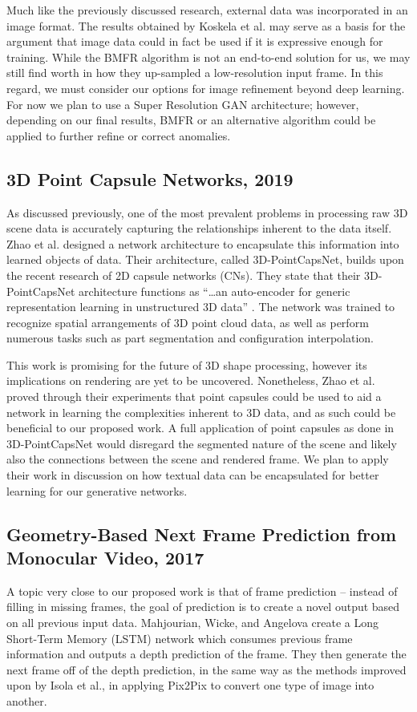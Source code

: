 \documentclass{article}
\begin{document}
Much like the previously discussed research, external data was incorporated
in an image format. The results obtained by Koskela et al. may serve as a basis
for the argument that image data could in fact be used if it is expressive enough
for training.
While the BMFR algorithm is not an end-to-end solution for us, we may still find
worth in how they up-sampled a low-resolution input frame. In this regard,
we must consider our options for image refinement beyond deep learning.
For now we plan to use a Super Resolution GAN architecture; however, depending on
our final results, BMFR or an alternative algorithm could be
applied to further refine or correct anomalies.

\subsection*{3D Point Capsule Networks, 2019}
\nocite{point_capsule}
As discussed previously, one of the most prevalent problems in processing raw 3D
scene data is accurately capturing the relationships inherent to the data itself.
Zhao et al. designed a network architecture to encapsulate this information into
learned objects of data. Their architecture, called 3D-PointCapsNet,
builds upon the recent research of 2D capsule networks (CNs).
They state that their 3D-PointCapsNet architecture functions as
``\dots an auto-encoder for generic representation
learning in unstructured 3D data'' \cite{point_capsule}. The network was trained
to recognize spatial arrangements of 3D point cloud data, as well as perform
numerous tasks such as part segmentation and configuration interpolation.

This work is promising for the future of 3D shape processing, however its
implications on rendering are yet to be uncovered. Nonetheless, Zhao et al.
proved through their experiments that point capsules could be used to
aid a network in learning the complexities inherent to 3D data, and as such
could be beneficial to our proposed work. A full application of point capsules
as done in 3D-PointCapsNet would disregard the segmented nature of the scene and
likely also the connections between the scene and rendered frame.
We plan to apply their work in discussion on how textual data can be encapsulated
for better learning for our generative networks.

\subsection*{Geometry-Based Next Frame Prediction from Monocular Video, 2017}
\nocite{frame_prediction}
A topic very close to our proposed work is that of frame prediction --
instead of filling in missing frames, the goal of prediction is to create a novel
output based on all previous input data.
Mahjourian, Wicke, and Angelova create a Long Short-Term Memory (LSTM) network
which consumes previous frame information and outputs a depth prediction of the
frame. They then generate the next frame off of the depth prediction, in the same
way as the methods improved upon by Isola et al., in applying Pix2Pix to convert 
one type of image into another.
\end{document}
